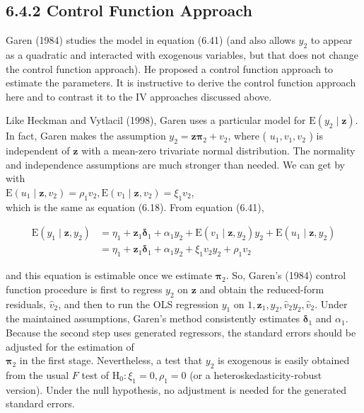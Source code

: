 \documentclass[10pt]{article}
\begin{document}
\subsection*{6.4.2 Control Function Approach}
Garen (1984) studies the model in equation (6.41) (and also allows $y_{2}$ to appear as a quadratic and interacted with exogenous variables, but that does not change the control function approach). He proposed a control function approach to estimate the parameters. It is instructive to derive the control function approach here and to contrast it to the IV approaches discussed above.

Like Heckman and Vytlacil (1998), Garen uses a particular model for $\mathrm{E}\left(y_{2} \mid \mathbf{z}\right)$. In fact, Garen makes the assumption $y_{2}=\mathbf{z} \boldsymbol{\pi}_{2}+v_{2}$, where ( $u_{1}, v_{1}, v_{2}$ ) is independent of $\mathbf{z}$ with a mean-zero trivariate normal distribution. The normality and independence assumptions are much stronger than needed. We can get by with\\
$\mathrm{E}\left(u_{1} \mid \mathbf{z}, v_{2}\right)=\rho_{1} v_{2}, \mathrm{E}\left(v_{1} \mid \mathbf{z}, v_{2}\right)=\xi_{1} v_{2}$,\\
which is the same as equation (6.18). From equation (6.41),


\begin{align*}
\mathrm{E}\left(y_{1} \mid \mathbf{z}, y_{2}\right) & =\eta_{1}+\mathbf{z}_{1} \boldsymbol{\delta}_{1}+\alpha_{1} y_{2}+\mathrm{E}\left(v_{1} \mid \mathbf{z}, y_{2}\right) y_{2}+\mathrm{E}\left(u_{1} \mid \mathbf{z}, y_{2}\right) \\
& =\eta_{1}+\mathbf{z}_{1} \boldsymbol{\delta}_{1}+\alpha_{1} y_{2}+\xi_{1} v_{2} y_{2}+\rho_{1} v_{2} \tag{6.51}
\end{align*}


and this equation is estimable once we estimate $\boldsymbol{\pi}_{2}$. So, Garen's (1984) control function procedure is first to regress $y_{2}$ on $\mathbf{z}$ and obtain the reduced-form residuals, $\hat{v}_{2}$, and then to run the OLS regression $y_{1}$ on $1, \mathbf{z}_{1}, y_{2}, \hat{v}_{2} y_{2}, \hat{v}_{2}$. Under the maintained assumptions, Garen's method consistently estimates $\boldsymbol{\delta}_{1}$ and $\alpha_{1}$. Because the second step uses generated regressors, the standard errors should be adjusted for the estimation of\\
$\boldsymbol{\pi}_{2}$ in the first stage. Nevertheless, a test that $y_{2}$ is exogenous is easily obtained from the usual $F$ test of $\mathrm{H}_{0}: \xi_{1}=0, \rho_{1}=0$ (or a heteroskedasticity-robust version). Under the null hypothesis, no adjustment is needed for the generated standard errors.
\end{document}
